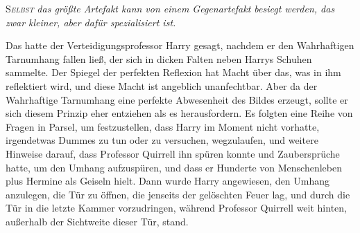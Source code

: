 
\lettrine{S}{\emph{elbst}} \emph{das größte Artefakt kann von einem Gegenartefakt besiegt werden, das zwar kleiner, aber dafür spezialisiert ist.}

Das hatte der Verteidigungsprofessor Harry gesagt, nachdem er den Wahrhaftigen Tarnumhang fallen ließ, der sich in dicken Falten neben Harrys Schuhen sammelte.
Der Spiegel der perfekten Reflexion hat Macht über das, was in ihm reflektiert wird, und diese Macht ist angeblich unanfechtbar. Aber da der Wahrhaftige Tarnumhang eine perfekte Abwesenheit des Bildes erzeugt, sollte er sich diesem Prinzip eher entziehen als es herausfordern.
Es folgten eine Reihe von Fragen in Parsel, um festzustellen, dass Harry im Moment nicht vorhatte, irgendetwas Dummes zu tun oder zu versuchen, wegzulaufen, und weitere Hinweise darauf, dass Professor Quirrell ihn spüren konnte und Zaubersprüche hatte, um den Umhang aufzuspüren, und dass er Hunderte von Menschenleben plus Hermine als Geiseln hielt.
Dann wurde Harry angewiesen, den Umhang anzulegen, die Tür zu öffnen, die jenseits der gelöschten Feuer lag, und durch die Tür in die letzte Kammer vorzudringen, während Professor Quirrell weit hinten, außerhalb der Sichtweite dieser Tür, stand.

